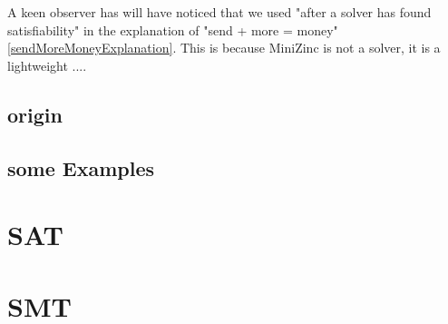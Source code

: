 \cite{53marriott1998programming}


A keen observer has will have noticed that we used "after a solver has found satisfiability" in the explanation of "send + more = money" \ref{sendMoreMoneyExplanation}. This is because MiniZinc is not a solver, it is a lightweight .... 


\subsection{origin}

\subsection{some Examples}

\section{SAT}
\label{CS:SAT}

\section{SMT}
\label{CS:SMT}


